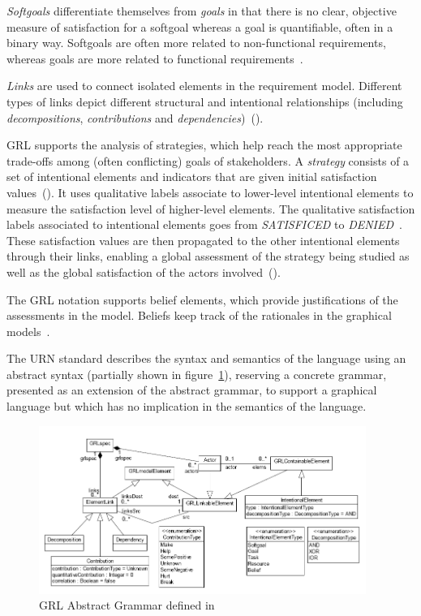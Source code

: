 \documentclass[dissertation,final]{softeng}
\begin{document}
{\emph{Softgoals} differentiate themselves from \emph{goals} in that there is no clear, objective measure of satisfaction for a softgoal whereas a goal is quantifiable, often in a binary way. Softgoals are often more related to non-functional requirements, whereas goals are more related to functional requirements~\citep{amyot2011user}.

\emph{Links} are used to connect isolated elements in the requirement model. Different types of links depict different structural and intentional relationships (including \emph{decompositions}, \emph{contributions} and \emph{dependencies})~().

GRL supports the analysis of strategies, which help reach the most appropriate trade-offs among (often conflicting) goals of stakeholders. A \emph{strategy} consists of a set of intentional elements and indicators that are given initial satisfaction values~(). It uses qualitative labels associate to lower-level intentional elements to measure the satisfaction level of higher-level elements. The qualitative satisfaction labels associated to intentional elements goes from \emph{SATISFICED} to \emph{DENIED}~\citep{Roy:2007wyba}. These satisfaction values are then propagated to the other intentional elements through their links, enabling a global assessment of the strategy being studied as well as the global satisfaction of the actors involved~().

The GRL notation supports belief elements, which provide justifications of the assessments in the model. Beliefs keep track of the rationales in the graphical models~\citep{Roy:2007wyba}.

The URN standard describes the syntax and semantics of the language using an abstract syntax (partially shown in figure~\ref{fig:grl_abstract_grammar}), reserving a concrete grammar, presented as an extension of the abstract grammar, to support a graphical language but which has no implication in the semantics of the language.

\begin{figure}[h]
\includegraphics[width=0.95\textwidth]{grl_abstract_grammar}
\centering
\caption[GRL Abstract Grammar]{GRL Abstract Grammar defined in~}
\label{fig:grl_abstract_grammar}
\end{figure}

}
\end{document}
